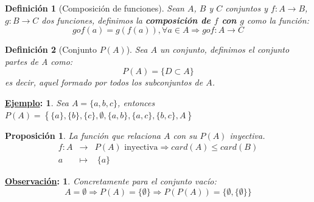 \documentclass[10pt,a4paper,openright]{book}
\theoremstyle{break}
\newtheorem*{defi}{Definición}
\newtheorem*{prop}{Proposición}
\newtheorem*{obs}{\underline{Observación}:}
\newtheorem*{ej}{\underline{Ejemplo}:}
\begin{document}
\begin{defi}[Composición de funciones]
Sean $A$, $B$ y $C$ conjuntos y $f: A\rightarrow B$, $g: B\rightarrow C$ dos funciones, definimos la \textbf{composición de $f$ con $g$} como la función:
$$gof(a)=g\left(f(a)\right),\forall a \in A\Rightarrow gof: A\rightarrow C$$
\end{defi}

\begin{defi}[Conjunto $P(A)$]
Sea $A$ un conjunto, definimos el conjunto \textit{partes de A} como:
$$P(A) = \{D \subset A\}$$
es decir, aquel formado por todos los subconjuntos de $A$.
\end{defi}

\begin{ej}
Sea $A=\{a,b,c\}$, entonces $P(A)=\left\lbrace \{a\}, \{b\},\{c\}, \emptyset, \{a,b\}, \{a,c\}, \{b,c\}, A \right\rbrace$
\end{ej}

\begin{prop}
La función que relaciona $A$ con su $P(A)$ inyectiva.
\begin{eqnarray*}
f: A & \rightarrow & P(A)\mbox{ inyectiva}\Rightarrow card(A)\leq card(B)\\
a & \longmapsto  & \; \{a\}
\end{eqnarray*}
\end{prop}

\begin{obs}
Concretamente para el conjunto vacío:
$$A=\emptyset \Rightarrow P(A)=\{\emptyset\} \Rightarrow P(P(A))=\{\emptyset, \{\emptyset\}\}$$
\end{obs}
\end{document}

